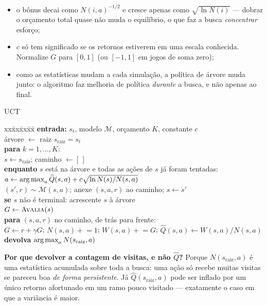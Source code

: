 \documentclass[a4paper, 11pt]{article}
\newcommand{\Mmod}{\mathcal{M}}
\newcommand{\Nv}[1]{N(#1)}
\newcommand{\Qh}{\widehat{Q}}
\newcommand{\ret}{G}
\newcommand{\raiz}{s_{\mathrm{raiz}}}
\begin{document}
\begin{itemize}
  \item o bônus decai como $\Nv{i,a}^{-1/2}$ e cresce apenas como
        $\sqrt{\ln \Nv{i}}$ --- dobrar o orçamento total quase não muda o
        equilíbrio, o que faz a busca \emph{concentrar} esforço;
  \item $c$ só tem significado se os retornos estiverem em uma escala conhecida.
        Normalize $\ret$ para $[0,1]$ (ou $[-1,1]$ em jogos de soma zero);
  \item como as estatísticas mudam a cada simulação, a política de árvore muda
        junto: o algoritmo faz melhoria de política \emph{durante} a busca, e não
        apenas ao final.
\end{itemize}

\begin{algbox}{UCT}
{\small
\begin{tabbing}
xx\=xx\=xx\=xx\=\kill
\textbf{entrada:} $s_t$, modelo $\Mmod$, orçamento $K$, constante $c$ \\
árvore $\gets$ raiz $\raiz = s_t$ \\
\textbf{para} $k=1,\dots,K$: \\
\> $s \gets \raiz$; \; caminho $\gets [\,]$ \\
\> \textbf{enquanto} $s$ está na árvore e todas as ações de $s$ já foram tentadas: \\
\>\> $a \gets \argmax_a \Qh(s,a) + c\sqrt{\ln \Nv{s}/\Nv{s,a}}$ \\
\>\> $(s',r) \sim \Mmod(s,a)$; \; anexe $(s,a,r)$ ao caminho; \; $s \gets s'$ \\
\> \textbf{se} $s$ não é terminal: acrescente $s$ à árvore \\
\> $\ret \gets \textsc{Avalia}(s)$ \\
\> \textbf{para} $(s,a,r)$ no caminho, de trás para frente: \\
\>\> $\ret \gets r + \gamma\ret$; \;\;
     $\Nv{s,a} \mathrel{+}= 1$; \;\;
     $W(s,a) \mathrel{+}= \ret$; \;\;
     $\Qh(s,a) \gets W(s,a)/\Nv{s,a}$ \\
\textbf{devolva} $\argmax_a \Nv{\raiz,a}$
\end{tabbing}}
\end{algbox}

\begin{ideiabox}
\textbf{Por que devolver a contagem de visitas, e não $\Qh$?}
Porque $\Nv{\raiz,a}$ é uma estatística acumulada sobre toda a busca: uma ação
só recebe muitas visitas se pareceu boa \emph{de forma persistente}. Já
$\Qh(\raiz,a)$ pode ser inflado por um único retorno afortunado em um ramo
pouco visitado --- exatamente o caso em que a variância é maior.
\end{ideiabox}
\end{document}

